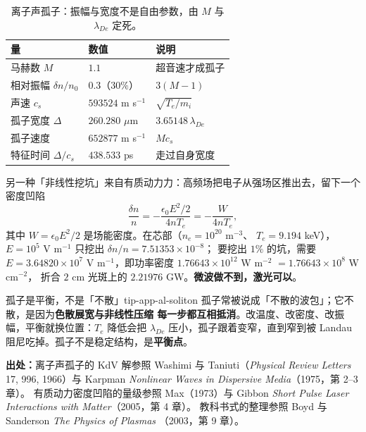 \begin{table}[htbp]
\centering
\small
\caption{离子声孤子：振幅与宽度不是自由参数，由 $M$ 与 $\lambda_{De}$ 定死。}
\label{tab:app-al-soliton}
\begin{tabular}{p{3.6cm}p{3.4cm}p{4.4cm}}
\toprule
量 & 数值 & 说明 \\
\midrule
马赫数 $M$ & $1.1$ & 超音速才成孤子 \\
相对振幅 $\delta n/n_0$ & $0.3$（$30\%$） & $3(M-1)$ \\
声速 $c_s$ & $593524$ m s$^{-1}$ & $\sqrt{T_e/m_i}$ \\
孤子宽度 $\Delta$ & $260.280$ $\mu$m & $3.65148\,\lambda_{De}$ \\
孤子速度 & $652877$ m s$^{-1}$ & $Mc_s$ \\
特征时间 $\Delta/c_s$ & $438.533$ ps & 走过自身宽度 \\
\bottomrule
\end{tabular}

\end{table}

另一种「非线性挖坑」来自有质动力力：高频场把电子从强场区推出去，留下一个密度凹陷
\begin{equation}
\frac{\delta n}{n} = -\frac{\epsilon_0E^2/2}{4nT_e} = -\frac{W}{4nT_e},
\label{eq:app-al-dent}
\end{equation}
其中 $W = \epsilon_0E^2/2$ 是场能密度。在芯部（$n_e = 10^{20}$ m$^{-3}$、
$T_e = 9.194$ keV），$E = 10^{5}$ V m$^{-1}$ 只挖出 $\delta n/n = 7.51353\times10^{-8}$；
要挖出 $1\%$ 的坑，需要 $E = 3.64820\times10^{7}$ V m$^{-1}$，即功率密度
$1.76643\times10^{12}$ W m$^{-2}$ $= 1.76643\times10^{8}$ W cm$^{-2}$，
折合 $2$ cm 光斑上的 $2.21976$ GW。\textbf{微波做不到，激光可以}。

\begin{tip}{孤子是平衡，不是「不散」}{tip-app-al-soliton}
孤子常被说成「不散的波包」；它不散，是因为\textbf{色散展宽与非线性压缩
每一步都互相抵消}。改温度、改密度、改振幅，平衡就换位置：$T_e$ 降低会把 $\lambda_{De}$
压小，孤子跟着变窄，直到窄到被 Landau 阻尼吃掉。孤子不是稳定结构，是\textbf{平衡点}。
\end{tip}

{\footnotesize
\textbf{出处：}离子声孤子的 KdV 解参照 Washimi 与 Taniuti（\emph{Physical Review Letters}
17, 996, 1966）与 Karpman \emph{Nonlinear Waves in Dispersive Media}（1975，第 2--3 章）。
有质动力密度凹陷的量级参照 Max（1973）与 Gibbon \emph{Short Pulse Laser Interactions with
Matter}（2005，第 4 章）。
教科书式的整理参照 Boyd 与 Sanderson \emph{The Physics of Plasmas}
（2003，第 9 章）。
}

